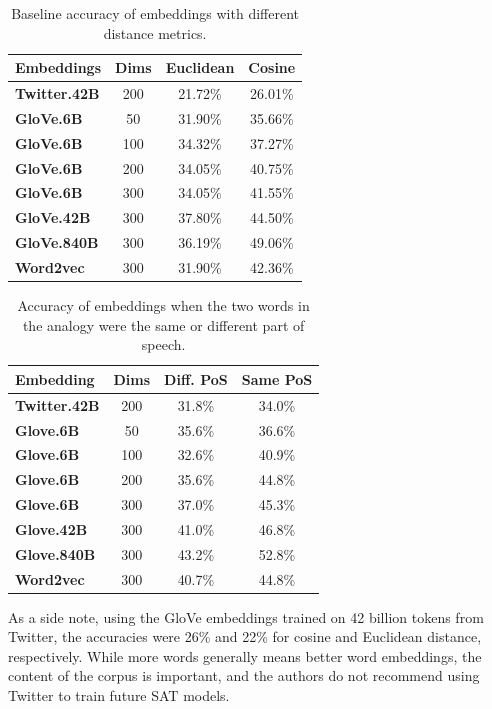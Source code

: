 \documentclass[11pt]{article}
\begin{document}
\begin{table}[h]
\begin{center}
\begin{tabular}{|l|ccc|}
\hline \bf Embeddings & \bf Dims & \bf Euclidean & \bf Cosine \\ \hline
	\bf Twitter.42B & 200 & 21.72\% & 26.01\% \\
	\bf GloVe.6B & 50 & 31.90\% & 35.66\% \\
	\bf GloVe.6B & 100 & 34.32\% & 37.27\% \\
	\bf GloVe.6B & 200 & 34.05\% & 40.75\% \\
	\bf GloVe.6B & 300 & 34.05\% & 41.55\% \\
	\bf GloVe.42B & 300 & 37.80\% & 44.50\% \\
	\bf GloVe.840B & 300 & 36.19\% & 49.06\% \\
	\bf Word2vec & 300 & 31.90\% & 42.36\% \\\hline
\end{tabular}
\end{center}
\caption{\label{font-table} Baseline accuracy of embeddings with different distance metrics.}
\end{table}

\begin{table}[h]
\begin{center}
\begin{tabular}{|l|ccc|}
\hline\bf Embedding & \bf Dims & \bf Diff. PoS & \bf Same PoS \\\hline
\bf Twitter.42B & 200 & 31.8\% & 34.0\% \\
\bf Glove.6B & 50 & 35.6\% & 36.6\% \\
\bf Glove.6B & 100 & 32.6\% & 40.9\% \\
\bf Glove.6B & 200 & 35.6\% & 44.8\% \\
\bf Glove.6B & 300 & 37.0\% & 45.3\% \\
\bf Glove.42B & 300 & 41.0\% & 46.8\% \\
\bf Glove.840B & 300 & 43.2\% & 52.8\% \\
\bf Word2vec & 300 & 40.7\% & 44.8\% \\\hline
\end{tabular}
\end{center}
\caption{\label{font-table} Accuracy of embeddings when the two words in the analogy were the same or different part of speech.}
\end{table}

As a side note, using the GloVe embeddings trained on 42 billion tokens from
Twitter, the accuracies were 26\% and 22\% for cosine and Euclidean distance,
respectively. While more words generally means better word embeddings, the
content of the corpus is important, and the authors do not recommend using
Twitter to train future SAT models.
\end{document}
